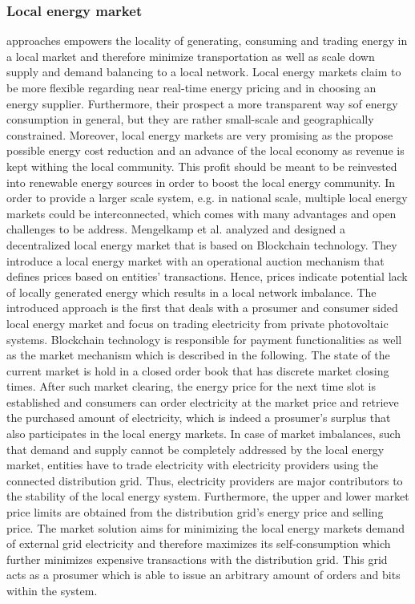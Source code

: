\documentclass[runningheads]{llncs}
\begin{document}
\subsubsection{Local energy market}
approaches empowers the locality of generating, consuming and trading energy in a local market and therefore minimize transportation as well as scale down supply and demand balancing to a local network. Local energy markets claim to be more flexible regarding near real-time energy pricing and in choosing an energy supplier. Furthermore, their prospect a more transparent way sof energy consumption in general, but they are rather small-scale and geographically constrained. Moreover, local energy markets are very promising as the propose possible energy cost reduction and an advance of the local economy as revenue is kept withing the local community. This profit should be meant to be reinvested into renewable energy sources in order to boost the local energy community.\cite{mengelkamp_lem} \newline
In order to provide a larger scale system, e.g. in national scale, multiple local energy markets could be interconnected, which comes with many advantages and open challenges to be address. Mengelkamp et al. \cite{mengelkamp_lem} analyzed and designed a decentralized local energy market that is based on Blockchain technology. They introduce a local energy market with an operational auction mechanism that defines prices based on entities’ transactions. Hence, prices indicate potential lack of locally generated energy which results in a local network imbalance.
The introduced approach is the first that deals with a prosumer and consumer sided local energy market and focus on trading electricity from private photovoltaic systems.
Blockchain technology is responsible for payment functionalities as well as the market mechanism which is described in the following. \newline
The state of the current market is hold in a closed order book that has discrete market closing times. After such market clearing, the energy price for the next time slot is established and consumers can order electricity at the market price and retrieve the purchased amount of electricity, which is indeed a prosumer’s surplus that also participates in the local energy markets. In case of market imbalances, such that demand and supply cannot be completely addressed by the local energy market, entities have to trade electricity with electricity providers using the connected distribution grid. Thus, electricity providers are major contributors to the stability of the local energy system. Furthermore, the upper and lower market price limits are obtained from the distribution grid’s energy price and selling price. The market solution aims for minimizing the local energy markets demand of external grid electricity and therefore maximizes its self-consumption which further minimizes expensive transactions with the distribution grid. This grid acts as a prosumer which is able to issue an arbitrary amount of orders and bits within the system. 
\end{document}
